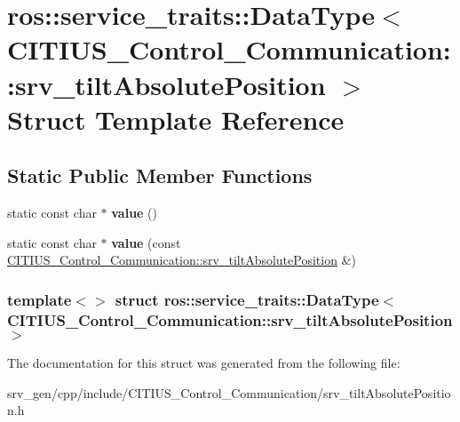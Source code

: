 \hypertarget{structros_1_1service__traits_1_1_data_type_3_01_c_i_t_i_u_s___control___communication_1_1srv__tilt_absolute_position_01_4}{\section{ros\-:\-:service\-\_\-traits\-:\-:\-Data\-Type$<$ \-C\-I\-T\-I\-U\-S\-\_\-\-Control\-\_\-\-Communication\-:\-:srv\-\_\-tilt\-Absolute\-Position $>$ \-Struct \-Template \-Reference}
\label{structros_1_1service__traits_1_1_data_type_3_01_c_i_t_i_u_s___control___communication_1_1srv__tilt_absolute_position_01_4}
}
\subsection*{\-Static \-Public \-Member \-Functions}
\begin{DoxyCompactItemize}
\item 
\hypertarget{structros_1_1service__traits_1_1_data_type_3_01_c_i_t_i_u_s___control___communication_1_1srv__tilt_absolute_position_01_4_af0a2ac43f8cf2344910251a36a87562f}{static const char $\ast$ {\bfseries value} ()}\label{structros_1_1service__traits_1_1_data_type_3_01_c_i_t_i_u_s___control___communication_1_1srv__tilt_absolute_position_01_4_af0a2ac43f8cf2344910251a36a87562f}

\item 
\hypertarget{structros_1_1service__traits_1_1_data_type_3_01_c_i_t_i_u_s___control___communication_1_1srv__tilt_absolute_position_01_4_ae47dc5395275bbcb2ea411d1e4e3957f}{static const char $\ast$ {\bfseries value} (const \hyperlink{struct_c_i_t_i_u_s___control___communication_1_1srv__tilt_absolute_position}{\-C\-I\-T\-I\-U\-S\-\_\-\-Control\-\_\-\-Communication\-::srv\-\_\-tilt\-Absolute\-Position} \&)}\label{structros_1_1service__traits_1_1_data_type_3_01_c_i_t_i_u_s___control___communication_1_1srv__tilt_absolute_position_01_4_ae47dc5395275bbcb2ea411d1e4e3957f}

\end{DoxyCompactItemize}
\subsubsection*{template$<$$>$ struct ros\-::service\-\_\-traits\-::\-Data\-Type$<$ C\-I\-T\-I\-U\-S\-\_\-\-Control\-\_\-\-Communication\-::srv\-\_\-tilt\-Absolute\-Position $>$}



\-The documentation for this struct was generated from the following file\-:\begin{DoxyCompactItemize}
\item 
srv\-\_\-gen/cpp/include/\-C\-I\-T\-I\-U\-S\-\_\-\-Control\-\_\-\-Communication/srv\-\_\-tilt\-Absolute\-Position.\-h\end{DoxyCompactItemize}
